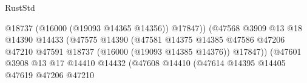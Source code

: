 \begin{lexlean}{RustStd}
\begin{coremodule}
                                                                  @18737
                                                                  (@16000 (@19093 @14365 @14356))
                                                                  @17847))
                                                              (@47568
                                                                @3909
                                                                @13
                                                                @18
                                                                @14390
                                                                @14433
                                                                (@47575
                                                                  @14390
                                                                  (@47581
                                                                    @14375
                                                                    @14385
                                                                    @47586
                                                                    @47206
                                                                    @47210
                                                                    @47591
                                                                    @18737
                                                                    (@16000 (@19093 @14385 @14376))
                                                                    @17847))
                                                                (@47601
                                                                  @3908
                                                                  @13
                                                                  @17
                                                                  @14410
                                                                  @14432
                                                                  (@47608
                                                                    @14410
                                                                    (@47614
                                                                      @14395
                                                                      @14405
                                                                      @47619
                                                                      @47206
                                                                      @47210

\end{coremodule}
\end{lexlean}
